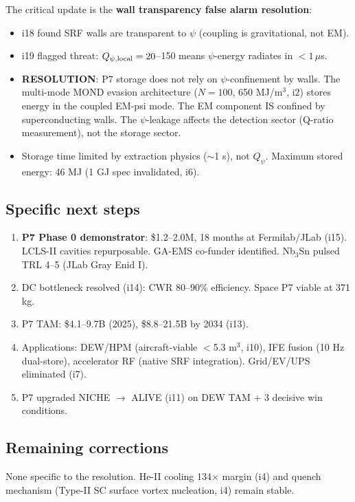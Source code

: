 \documentclass[11pt]{article}
\begin{document}
The critical update is the \textbf{wall transparency false alarm resolution}:
\begin{itemize}
\item i18 found SRF walls are transparent to $\psi$ (coupling is gravitational, not EM).
\item i19 flagged threat: $Q_{\psi,\rm local} = 20$--150 means $\psi$-energy radiates
in $<1\,\mu$s.
\item \textbf{RESOLUTION}: P7 storage does not rely on $\psi$-confinement by walls.
The multi-mode MOND evasion architecture ($N = 100$, 650 MJ/m$^3$, i2) stores energy
in the coupled EM-psi mode. The EM component IS confined by superconducting walls.
The $\psi$-leakage affects the detection sector (Q-ratio measurement), not the
storage sector.
\item Storage time limited by extraction physics ($\sim$1 s), not $Q_\psi$.
Maximum stored energy: 46 MJ (1 GJ spec invalidated, i6).
\end{itemize}

\subsection{Specific next steps}
\begin{enumerate}
\item \textbf{P7 Phase 0 demonstrator}: \$1.2--2.0M, 18 months at Fermilab/JLab (i15).
LCLS-II cavities repurposable. GA-EMS co-funder identified. Nb$_3$Sn pulsed TRL 4--5
(JLab Gray Enid I).
\item DC bottleneck resolved (i14): CWR 80--90\% efficiency. Space P7 viable at 371 kg.
\item P7 TAM: \$4.1--9.7B (2025), \$8.8--21.5B by 2034 (i13).
\item Applications: DEW/HPM (aircraft-viable $<$5.3 m$^3$, i10), IFE fusion (10 Hz
dual-store), accelerator RF (native SRF integration). Grid/EV/UPS eliminated (i7).
\item P7 upgraded NICHE $\to$ ALIVE (i11) on DEW TAM + 3 decisive win conditions.
\end{enumerate}

\subsection{Remaining corrections}
None specific to the resolution. He-II cooling 134$\times$ margin (i4) and quench
mechanism (Type-II SC surface vortex nucleation, i4) remain stable.

\newpage
\end{document}
